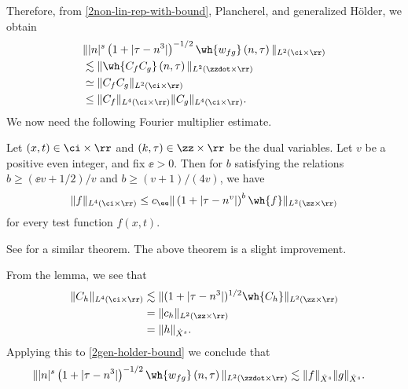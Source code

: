 %
%
Therefore, from \eqref{2non-lin-rep-with-bound}, Plancherel, and generalized 
H\"{o}lder, we obtain
%
%
\begin{equation}
	\label{2gen-holder-bound}
	\begin{split}
		& \| |n|^s \left( 1 + | \tau - n^3 | \right )^{-1/2}  \wh{w_{fg}}\left( 
		n, \tau \right) \|_{L^2(\ci \times \rr)}
		\\
		& \lesssim \|\wh{C_f C_g }\left( n, \tau \right) 
		\|_{L^2\left( \zzdot \times \rr \right)}
		\\
		& \simeq \|C_f C_g \|_{L^2\left( \ci \times \rr \right)}
		\\
		& \le \|C_f \|_{L^4(\ci \times \rr)} \|C_g \|_{L^4(\ci \times \rr)}.
	\end{split}
\end{equation}
%
We now need the following Fourier multiplier estimate. 
\begin{lemma}
	\label{2lem:four-mult-est-L4}
	Let $(x, t) \in \ci \times \rr $ and $(k, \tau) \in \zz \times \rr$ be
	the dual variables. Let $v$ be a positive even integer, and fix $\ee >
	0$. Then for $b$ satisfying the relations $b \ge (\ee v + 1/2)/v$ and $b \ge (v+1)/(4v)$, we have
\begin{equation}
	\label{2four-mult-est-L4}
	\begin{split}
		\|f\|_{L^4(\ci \times \rr)} \le c_\ee \|\left( 1 + | \tau - n^v | 
		\right)^b \wh{f} \|_{L^2( \zz \times \rr)}
	\end{split}
\end{equation}
for every test function $f(x, t)$. 
%
%
%
%
\end{lemma}
\begin{framed}
%
%
\begin{remark}
  See \cite{Himonas_2007_Non-uniform-con} for a similar theorem. The above theorem is a slight improvement. 
\end{remark}
%
%
\end{framed}
From the lemma, we see that
%
%
\begin{equation}
	\label{2four-mult-conseq}
	\begin{split}
		\|C_h\|_{L^4(\ci \times \rr)} 
		& \lesssim \|(1 + | \tau - n^3 |)^{1/2} \wh{C_h}
		\|_{L^2(\zz \times \rr)}
		\\
		& = \|c_{h} \|_{L^2(\zz \times \rr)} 
		\\
		& = \|h \|_{\dot{X}^s}. 
	\end{split}
\end{equation}
%
%
Applying this to \eqref{2gen-holder-bound} we
conclude that
\begin{equation*}
	\begin{split}
		\| |n|^s \left( 1 + | \tau - n^3 | \right ) ^{-1/2} \wh{w_{fg}}\left( 
		n, \tau \right) \|_{L^2(\zzdot \times \rr)}
		& \lesssim \|f\|_{\dot{X}^s} \|g\|_{\dot{X}^s}.
	\end{split}
\end{equation*}
%
%
%
